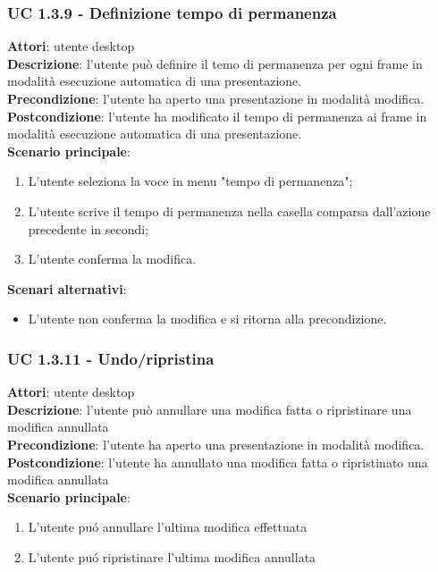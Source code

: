 \subsubsection{UC 1.3.9 - Definizione tempo di permanenza}{
	\label{uc1.3.9}
	\textbf{Attori}: utente desktop \\
	\textbf{Descrizione}: l'utente può definire il temo di permanenza per ogni frame in modalità esecuzione automatica di una presentazione. \\
	\textbf{Precondizione}: l'utente ha aperto una presentazione in modalità modifica.	\\
	\textbf{Postcondizione}: l'utente ha modificato il tempo di permanenza ai frame in modalità esecuzione automatica di una presentazione.	\\
	\textbf{Scenario principale}:
	\begin{enumerate}
		\item L'utente seleziona la voce in menu "tempo di permanenza";
		\item L'utente scrive il tempo di permanenza nella casella comparsa dall'azione precedente in secondi;
		\item L'utente conferma la modifica.
	\end{enumerate}
	\textbf{Scenari alternativi}:
	\begin{itemize}
		\item L'utente non conferma la modifica  e si ritorna alla precondizione.
	\end{itemize}
}
\subsubsection{UC 1.3.11 - Undo/ripristina }{
	\label{uc1.3.10}
	\textbf{Attori}: utente desktop \\
	\textbf{Descrizione}: l'utente può annullare una modifica fatta o ripristinare una modifica annullata \\
	\textbf{Precondizione}: l'utente ha aperto una presentazione in modalità modifica.	\\
	\textbf{Postcondizione}: l'utente ha annullato una modifica fatta o ripristinato una modifica annullata	\\
	\textbf{Scenario principale}:
	\begin{enumerate}
		\item L'utente pu\'o annullare l'ultima modifica effettuata
		\item L'utente pu\'o ripristinare l'ultima modifica annullata
	\end{enumerate}
}
